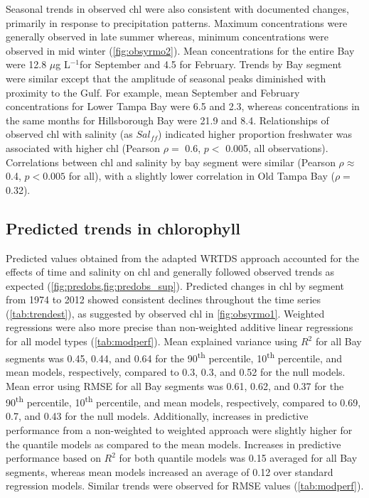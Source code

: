 \documentclass[letterpaper,12pt,oneside]{article}\usepackage[]{graphicx}\usepackage[]{color}
\newcommand{\mugl}{$\mu$g L$^{-1}$}
\begin{document}
Seasonal trends in observed \ac{chl} were also consistent with documented changes, primarily in response to precipitation patterns.  Maximum concentrations were generally observed in late summer whereas, minimum concentrations were observed in mid winter (\cref{fig:obsyrmo2}).  Mean concentrations for the entire Bay were 12.8 \mugl for September and 4.5 for February.  Trends by Bay segment were similar except that the amplitude of seasonal peaks diminished with proximity to the Gulf.  For example, mean September and February concentrations for Lower Tampa Bay were 6.5 and 2.3, whereas concentrations in the same months for Hillsborough Bay were 21.9 and 8.4.  Relationships of observed \ac{chl} with salinity (as $Sal_{ff}$) indicated higher proportion freshwater was associated with higher \ac{chl} (Pearson $\rho=$ 0.6, $p<$ 0.005, all observations).  Correlations between \ac{chl} and salinity by bay segment were similar (Pearson $\rho \approx$ 0.4, $p<0.005$ for all), with a slightly lower correlation in Old Tampa Bay ($\rho=$ 0.32).

\subsection{Predicted trends in chlorophyll}

Predicted values obtained from the adapted \ac{WRTDS} approach accounted for the effects of time and salinity on \ac{chl} and generally followed observed trends as expected (\cref{fig:predobs,fig:predobs_sup}).  Predicted changes in \ac{chl} by segment from 1974 to 2012 showed consistent declines throughout the time series (\cref{tab:trendest}), as suggested by observed \ac{chl} in \cref{fig:obsyrmo1}.  Weighted regressions were also more precise than non-weighted additive linear regressions for all model types (\cref{tab:modperf}).   Mean explained variance using $R^2$ for all Bay segments was 0.45, 0.44, and 0.64 for the 90\textsuperscript{th} percentile, 10\textsuperscript{th} percentile, and mean models, respectively, compared to 0.3, 0.3, and 0.52 for the null models.  Mean error using \ac{RMSE} for all Bay segments was 0.61, 0.62, and 0.37 for the 90\textsuperscript{th} percentile, 10\textsuperscript{th} percentile, and mean models, respectively, compared to 0.69, 0.7, and 0.43 for the null models.  Additionally, increases in predictive performance from a non-weighted to weighted approach were slightly higher for the quantile models as compared to the mean models.  Increases in predictive performance based on $R^2$ for both quantile models was 0.15 averaged for all Bay segments, whereas mean models increased an average of 0.12 over standard regression models. Similar trends were observed for \ac{RMSE} values (\cref{tab:modperf}).    
\end{document}
